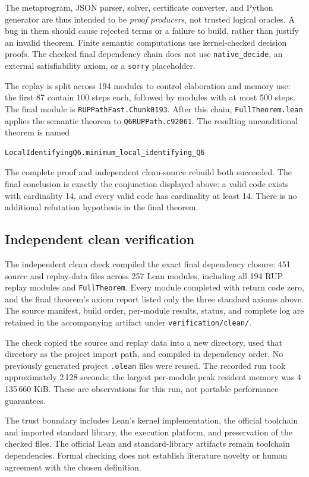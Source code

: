 \documentclass[11pt]{article}
\begin{document}
The metaprogram, JSON parser, solver, certificate converter, and Python generator are thus intended to be \emph{proof producers}, not trusted logical oracles. A bug in them should cause rejected terms or a failure to build, rather than justify an invalid theorem. Finite semantic computations use kernel-checked decision proofs. The checked final dependency chain does not use \texttt{native\_decide}, an external satisfiability axiom, or a \texttt{sorry} placeholder.

The replay is split across 194 modules to control elaboration and memory use: the first 87 contain 100 steps each, followed by modules with at most 500 steps. The final module is \texttt{RUPPathFast.Chunk0193}. After this chain, \texttt{FullTheorem.lean} applies the semantic theorem to \texttt{Q6RUPPath.c92061}. The resulting unconditional theorem is named
\begin{lstlisting}
LocalIdentifyingQ6.minimum_local_identifying_Q6
\end{lstlisting}
The complete proof and independent clean-source rebuild both succeeded. The final conclusion is exactly the conjunction displayed above: a valid code exists with cardinality 14, and every valid code has cardinality at least 14. There is no additional refutation hypothesis in the final theorem.

\subsection{Independent clean verification}
The independent clean check compiled the exact final dependency closure: 451 source and replay-data files across 257 Lean modules, including all 194 RUP replay modules and \texttt{FullTheorem}. Every module completed with return code zero, and the final theorem's axiom report listed only the three standard axioms above. The source manifest, build order, per-module results, status, and complete log are retained in the accompanying artifact under \texttt{verification/clean/}.

The check copied the source and replay data into a new directory, used that directory as the project import path, and compiled in dependency order. No previously generated project \texttt{.olean} files were reused. The recorded run took approximately 2\,128 seconds; the largest per-module peak resident memory was 4\,135\,660 KiB. These are observations for this run, not portable performance guarantees.

The trust boundary includes Lean's kernel implementation, the official toolchain and imported standard library, the execution platform, and preservation of the checked files. The official Lean and standard-library artifacts remain toolchain dependencies. Formal checking does not establish literature novelty or human agreement with the chosen definition.
\end{document}
